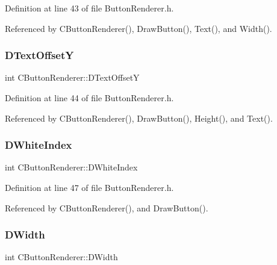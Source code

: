 Definition at line 43 of file Button\+Renderer.\+h.



Referenced by C\+Button\+Renderer(), Draw\+Button(), Text(), and Width().

\hypertarget{classCButtonRenderer_a3922fa80775b693fd83e4d5e9f518b23}{}\label{classCButtonRenderer_a3922fa80775b693fd83e4d5e9f518b23} 
\subsubsection{\texorpdfstring{D\+Text\+OffsetY}{DTextOffsetY}}
{\footnotesize\ttfamily int C\+Button\+Renderer\+::\+D\+Text\+OffsetY\hspace{0.3cm}{\ttfamily [protected]}}



Definition at line 44 of file Button\+Renderer.\+h.



Referenced by C\+Button\+Renderer(), Draw\+Button(), Height(), and Text().

\hypertarget{classCButtonRenderer_a931258275773c59f73b769ec0574b615}{}\label{classCButtonRenderer_a931258275773c59f73b769ec0574b615} 
\subsubsection{\texorpdfstring{D\+White\+Index}{DWhiteIndex}}
{\footnotesize\ttfamily int C\+Button\+Renderer\+::\+D\+White\+Index\hspace{0.3cm}{\ttfamily [protected]}}



Definition at line 47 of file Button\+Renderer.\+h.



Referenced by C\+Button\+Renderer(), and Draw\+Button().

\hypertarget{classCButtonRenderer_a5c2ce68af06e91c14cbd1b8dd8bd4b94}{}\label{classCButtonRenderer_a5c2ce68af06e91c14cbd1b8dd8bd4b94} 
\subsubsection{\texorpdfstring{D\+Width}{DWidth}}
{\footnotesize\ttfamily int C\+Button\+Renderer\+::\+D\+Width\hspace{0.3cm}{\ttfamily [protected]}}



